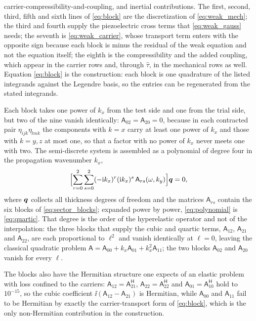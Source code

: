 carrier-compressibility-and-coupling, and inertial contributions.  The first,
second, third, fifth and sixth lines of \eqref{eq:block} are the discretization of
\eqref{eq:weak_mech}; the third and fourth supply the piezoelectric cross terms
that \eqref{eq:weak_gauss} needs; the seventh is \eqref{eq:weak_carrier}, whose
transport term enters with the opposite sign because each block is minus the residual of the weak equation and not the equation itself;
the eighth is the compressibility and the added coupling, which appear in the carrier
rows and, through $\widehat\tau$, in the mechanical rows as well.  Equation
\eqref{eq:block} is the construction: each block is one quadrature of the listed
integrands against the Legendre basis, so the entries can be regenerated from the
stated integrands.

Each block takes one power of $k_x$ from the test side and one from the trial
side, but two of the nine vanish identically: $\mathsf A_{02}=\mathsf A_{20}=0$,
because in each contracted pair $\eta_{ijk}\eta_{lmk}$ the components with $k=x$ carry at
least one power of $k_x$ and those with $k=y,z$ at most one, so that a factor with no
power of $k_x$ never meets one with two.  The semi-discrete system is assembled as a polynomial of degree four in the
propagation wavenumber $k_x$,
\begin{equation}
\label{eq:polynomial}
\Bigl[\sum_{r=0}^{2}\sum_{s=0}^{2}(-\mathrm{i} k_x)^{r}(\mathrm{i} k_x)^{s}\,
\mathsf{A}_{rs}(\omega,k_y)\Bigr]\boldsymbol{q}=0 ,
\end{equation}
where $\boldsymbol{q}$ collects all thickness degrees of freedom and the matrices
$\mathsf{A}_{rs}$ contain the six blocks of \eqref{eq:sector_blocks}; expanded
power by power, \eqref{eq:polynomial} is \eqref{eq:quartic}.  That degree is the order of the hyperelastic
operator and not of the interpolation: the three blocks that supply the cubic and
quartic terms, $\mathsf A_{12}$, $\mathsf A_{21}$ and $\mathsf A_{22}$, are
each proportional to $\ell^{2}$ and vanish identically at $\ell=0$, leaving the
classical quadratic problem
$\mathsf A=\mathsf A_{00}+k_x\mathsf A_{01}+k_x^{2}\mathsf A_{11}$; the two
blocks $\mathsf A_{02}$ and $\mathsf A_{20}$ vanish for every $\ell$.

The blocks also have the Hermitian structure one expects of an elastic problem
with loss confined to the carriers: $\mathsf A_{12}=\mathsf A_{21}^{\mathsf H}$,
$\mathsf A_{22}=\mathsf A_{22}^{\mathsf H}$ and
$\mathsf A_{01}=\mathsf A_{10}^{\mathsf H}$ hold to $10^{-15}$, so the cubic
coefficient $\ii(\mathsf A_{12}-\mathsf A_{21})$ is Hermitian, while
$\mathsf A_{00}$ and $\mathsf A_{11}$ fail to be Hermitian by exactly the
carrier-transport form of \eqref{eq:block}, which is the only non-Hermitian
contribution in the construction.

